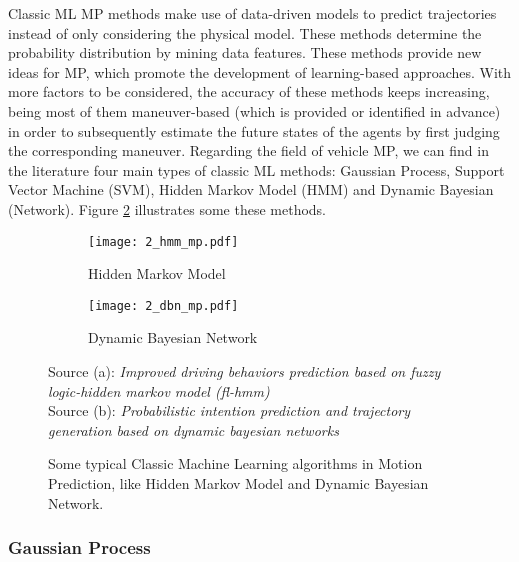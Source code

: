 Classic ML \ac{MP} methods make use of data-driven models to predict trajectories instead of only considering the physical model. These methods determine the probability distribution by mining data features. These methods provide new ideas for \ac{MP}, which promote the development of learning-based approaches. With more factors to be considered, the accuracy of these methods keeps increasing, being most of them maneuver-based (which is provided or identified in advance) in order to subsequently estimate the future states of the agents by first judging the corresponding maneuver. Regarding the field of vehicle \ac{MP}, we can find in the literature four main types of classic ML methods: Gaussian Process, Support Vector Machine (SVM), Hidden Markov Model (HMM) and Dynamic Bayesian (Network). Figure \ref{fig:2_dbn_mp} illustrates some these methods. 

\begin{figure}[t!]
	\begin{subfigure}{0.5\textwidth}
		\texttt{[image: 2\_hmm\_mp.pdf]}
		\caption{Hidden Markov Model}
		\label{fig:2_hmm_mp}
	\end{subfigure}
	\hfill
	\begin{subfigure}{0.5\textwidth}
		\texttt{[image: 2\_dbn\_mp.pdf]}
		\caption{Dynamic Bayesian Network}
		\label{fig:2_dbn_mp}
	\end{subfigure}
	
	\caption[Some typical Classic Machine Learning algorithms in Motion Prediction]{Some typical Classic Machine Learning algorithms in Motion Prediction, like Hidden Markov Model and Dynamic Bayesian Network.}
	Source (a): \textit{Improved driving behaviors prediction based on fuzzy logic-hidden markov model (fl-hmm)} \cite{deng2018improved} \\
	Source (b): \textit{Probabilistic intention prediction and trajectory generation based on dynamic bayesian networks} \cite{he2019probabilistic}
	\label{fig:2_classic_ml_mp}
\end{figure}

\subsubsection{Gaussian Process}
\label{subsubsec:2_gaussian_process_mp}

